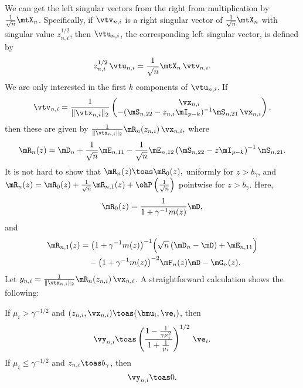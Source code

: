 We can get the left singular vectors from the right from multiplication
by $\frac{1}{\sqrt{n}} \mtX_n$.  Specifically, if $\vtv_{n,i}$ is a right
singular vector of $\frac{1}{\sqrt{n}} \mtX_n$ with singular value
$z_{n,i}^{1/2}$, then $\vtu_{n,i}$, the corresponding left singular vector,
is defined by
\[
    z_{n,i}^{1/2} \,
    \vtu_{n,i}
        = 
        \frac{1}{\sqrt{n}}
        \mtX_n \,
        \vtv_{n,i}.
\]
We are only interested in the first $k$ components of $\vtu_{n,i}$.  If
\[
    \vtv_{n,i}
    =
    \frac{1}{\| \vtx_{n,i} \|_2 }
    \left(
    \begin{matrix}
        \vx_{n,i} \\
        -( \mS_{n,22} - z_{n,i} \mI_{p-k} )^{-1} \mS_{n,21} \, \vx_{n,i}
    \end{matrix}
    \right),
\]
then these are given by
\(
    \frac{1}{\| \vtx_{n,i} \|_2 } \mR_n(z_{n,i}) \, \vx_{n,i},
\)
where
\[
    \mR_n(z)
    =
    \mD_n 
    + 
    \frac{1}{\sqrt{n}}
    \mE_{n,11}
    - 
    \frac{1}{\sqrt{n}}
    \mE_{n,12}
    \left( \mS_{n,22} - z \mI_{p-k} \right)^{-1}
    \mS_{n,21}.
\]
It is not hard to show that
\(
    \mR_n(z) \toas \mR_0(z),
\)
uniformly for $z > b_\gamma$, and
\(
    \mR_n(z) 
        = 
            \mR_0(z) 
            + 
            \frac{1}{\sqrt{n}} \mR_{n,1}(z) 
            + 
            \ohP\left( \frac{1}{\sqrt{n}} \right)
\)
pointwise for $z > b_\gamma$.  Here,
\[
    \mR_0(z) = \frac{1}{ 1 + \gamma^{-1} m(z) } \mD,
\]
and
\[
    \begin{split}
    \mR_{n,1}(z)
    &=
    \big( 1 + \gamma^{-1} m(z) \big)^{-1}
    \Big(
        \sqrt{n} \left( \mD_n  - \mD \right)
        +
        \mE_{n,11}
    \Big) \\
    &\quad- 
    \big( 1 + \gamma^{-1} m(z) \big)^{-2}
    \mF_{n}(z) \mD
    - 
    \mG_n(z).
    \end{split}
\]
Let $y_{n,i} = \frac{1}{\| \vtx_{n,i} \|_2 } \mR_n(z_{n,i}) \, \vx_{n,i}$.
A straightforward calculation shows the following:

\begin{lemma}
    If $\mu_i > \gamma^{-1/2}$ and 
    $(z_{n,i}, \vx_{n,i}) \toas (\bmu_i, \ve_i)$, then 
    \[
        \vy_{n,i}
            \toas
                \left(
                \frac{1 - \tfrac{ 1 }{ \gamma \mu_i^2 } }
                     { 1 + \tfrac{1}{\mu_i} } \right)^{1/2} \,
                \ve_i .
    \]
    If $\mu_i \leq \gamma^{-1/2}$ and $z_{n,i} \toas b_\gamma$, then
    \[
        \vy_{n,i} \toas 0.
    \]
\end{lemma}


